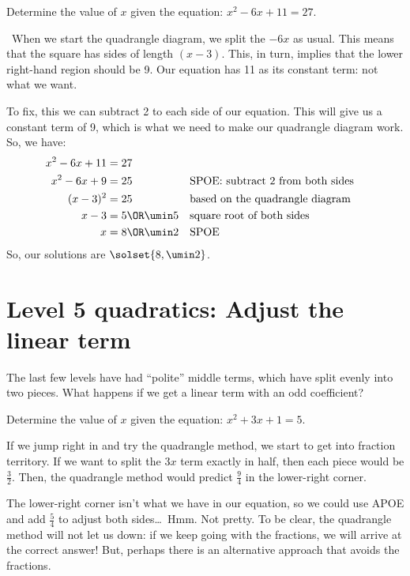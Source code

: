 \begin{boxex}
Determine the value of $x$ given the equation: $x^2-6x+11=27$.

\exsoln\ When we start the quadrangle diagram, we split the $-6x$ as usual. This means that the square has sides of length $(x-3)$. This, in turn, implies that the lower right-hand region should be 9. Our equation has 11 as its constant term: not what we want.


To fix, this we can subtract 2 to each side of our equation. This will give us a constant term of 9, which is what we need to make our quadrangle diagram work. So, we have:
\begin{align*}
x^2 - 6x + 11 &= 27
\\
x^2 - 6x + 9 &= 25
&&\text{SPOE: subtract 2 from both sides}
\\
(x-3)^2 &= 25
&&\text{based on the quadrangle diagram}
\\
x-3 &= 5 \OR \umin5
&&\text{square root of both sides}
\\
x &= 8 \OR \umin2
&&\text{SPOE}
\end{align*}
So, our solutions are $\solset{8, \umin2}$.
\end{boxex}

\section{Level 5 quadratics: Adjust the linear term}

The last few levels have had ``polite'' middle terms, which have split evenly into two pieces. What happens if we get a linear term with an odd coefficient?

\begin{boxexplore}
Determine the value of $x$ given the equation: $x^2 + 3x + 1 = 5$.
\end{boxexplore} %

If we jump right in and try the quadrangle method, we start to get into fraction territory. If we want to split the $3x$ term exactly in half, then each piece would be $\frac{3}{2}$. Then, the quadrangle method would predict $\frac{9}{4}$ in the lower-right corner.


The lower-right corner isn't what we have in our equation, so we could use APOE and add $\frac{5}{4}$ to adjust both sides\ldots\ Hmm. Not pretty. To be clear, the quadrangle method will not let us down: if we keep going with the fractions, we will arrive at the correct answer! But, perhaps there is an alternative approach that avoids the fractions.

